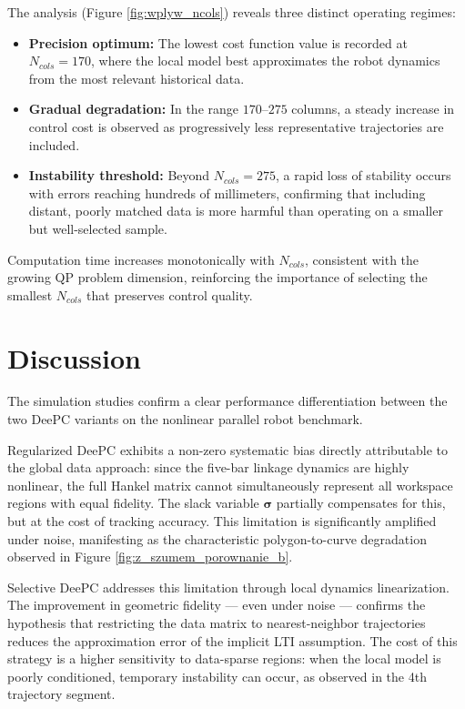 The analysis (Figure \ref{fig:wplyw_ncols}) reveals three distinct operating regimes:
\begin{itemize}
    \item \textbf{Precision optimum:} The lowest cost function value is recorded at $N_{cols}=170$, where the local model best approximates the robot dynamics from the most relevant historical data.
    \item \textbf{Gradual degradation:} In the range $170$--$275$ columns, a steady increase in control cost is observed as progressively less representative trajectories are included.
    \item \textbf{Instability threshold:} Beyond $N_{cols}=275$, a rapid loss of stability occurs with errors reaching hundreds of millimeters, confirming that including distant, poorly matched data is more harmful than operating on a smaller but well-selected sample.
\end{itemize}
Computation time increases monotonically with $N_{cols}$, consistent with the growing QP problem dimension, reinforcing the importance of selecting the smallest $N_{cols}$ that preserves control quality.

\section{Discussion}

The simulation studies confirm a clear performance differentiation between the two DeePC variants on the nonlinear parallel robot benchmark.

Regularized DeePC exhibits a non-zero systematic bias directly attributable to the global data approach: since the five-bar linkage dynamics are highly nonlinear, the full Hankel matrix cannot simultaneously represent all workspace regions with equal fidelity. The slack variable $\boldsymbol{\sigma}$ partially compensates for this, but at the cost of tracking accuracy. This limitation is significantly amplified under noise, manifesting as the characteristic polygon-to-curve degradation observed in Figure \ref{fig:z_szumem_porownanie_b}.

Selective DeePC addresses this limitation through local dynamics linearization. The improvement in geometric fidelity — even under noise — confirms the hypothesis that restricting the data matrix to nearest-neighbor trajectories reduces the approximation error of the implicit LTI assumption. The cost of this strategy is a higher sensitivity to data-sparse regions: when the local model is poorly conditioned, temporary instability can occur, as observed in the 4th trajectory segment.

